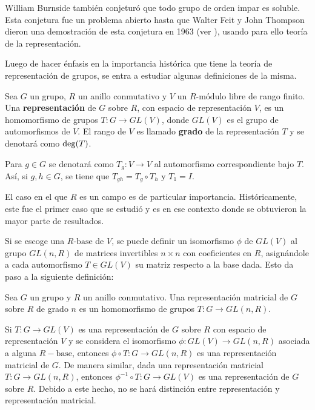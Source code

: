 William Burnside también conjeturó que todo grupo de orden impar es soluble. Esta conjetura fue un problema abierto hasta que Walter Feit y John Thompson dieron una demostración de esta conjetura en 1963 (ver \cite{bib:solubilidad}), usando para ello teoría de la representación. 

Luego de hacer énfasis en la importancia histórica que tiene la teoría de representación de grupos, se entra a estudiar algunas definiciones de la misma.


\begin{definicion}
Sea $G$ un grupo, $R$ un anillo conmutativo y $V$ un $R\mbox{-módulo}$ libre de rango finito. Una \textbf{representación} de $G$ sobre $R$, con espacio de representación $V$, es un homomorfismo de grupos $T \colon G \to GL(V)$, donde $GL(V)$ es el grupo de automorfismos de $V$. El rango de $V$ es llamado \textbf{grado} de la representación $T$ y se denotará como $\operatorname{deg}(T)$.
\end{definicion}

Para $g \in G$ se denotará como $T_g \colon V \to V$ al automorfismo correspondiente bajo $T$. Así, si $g, h \in G$, se tiene que $T_{gh} = T_g \circ T_h$ y $T_1 = I$.

El caso en el que $R$ es un campo es de particular importancia. Históricamente, este fue el primer caso que se estudió y es en ese contexto donde se obtuvieron la mayor parte de resultados. 

Si se escoge una $R\mbox{-base}$ de $V$, se puede definir un isomorfismo $\phi$ de $GL(V)$ al grupo $GL(n,R)$ de matrices invertibles $n\times n$ con coeficientes en $R$, asignándole a cada automorfismo $T \in GL(V)$ su matriz respecto a la base dada. Esto da paso a la siguiente definición:

\begin{definicion}
Sea $G$ un grupo y $R$ un anillo conmutativo. Una representación matricial de $G$ sobre $R$ de grado $n$ es un homomorfismo de grupos $T \colon G \to GL(n,R)$.
 

\end{definicion} 


Si $T \colon G \to GL(V)$ es una representación de $G$ sobre $R$ con espacio de representación $V$ y se considera el isomorfismo $\phi \colon GL(V) \to GL(n,R)$ asociada a alguna $R-\mbox{base}$, entonces $\phi \circ T \colon G \to GL(n, R)$ es una representación matricial de $G$. De manera similar, dada una representación matricial $T \colon G \to GL(n,R)$, entonces $\phi^{-1}\circ T \colon G \to GL(V)$ es una representación de $G$ sobre $R$. Debido a este hecho, no se hará distinción entre representación y representación matricial.

